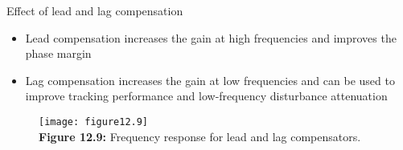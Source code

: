 \documentclass{beamer-control}
\begin{document}
\begin{frame}{Effect of lead and lag compensation}
\begin{itemize}
	\item Lead compensation increases the gain at high frequencies and improves the phase margin
	\item Lag compensation increases the gain at low frequencies and can be used to improve tracking performance and low-frequency disturbance attenuation
\end{itemize}

\begin{figure}
	\centering
	\texttt{[image: figure12.9]}\\
	\vspace{-0.2cm}
	\textbf{Figure 12.9:} Frequency response for lead and lag compensators.
\end{figure}
\end{frame}


\SUMMARYFRAME
\FINALE
\end{document}
